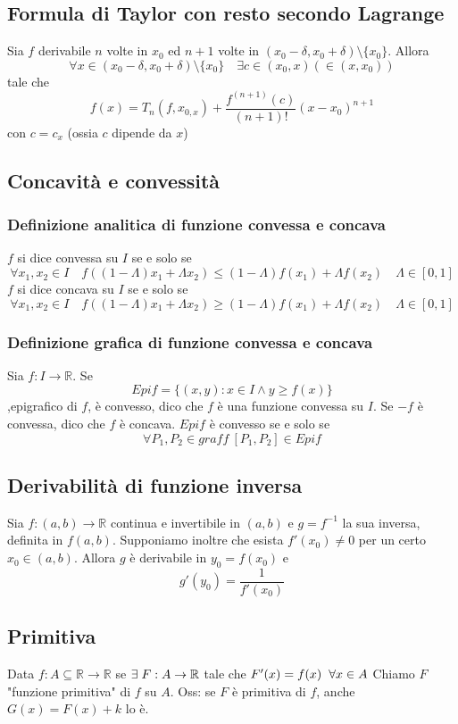 \documentclass[12pt]{article}
\begin{document}
\subsection{Formula di Taylor con resto secondo Lagrange}
Sia $f$ derivabile $n$ volte in $x_0$ ed $n+1$ volte
in $(x_0 - \delta, x_0 + \delta) \setminus \{x_0\}$. Allora 
\[ 
\forall x \in (x_0 - \delta, x_0 + \delta) \setminus \{x_0\} \quad \exists c \in (x_0, x) (\in(x, x_0))
\] 
tale che 
\[ 
f(x) = T_n(f, x_{0,x}) + \frac{f^{(n+1)}(c)}{(n+1)!}(x-x_0)^{n+1} 
\]
con $c=c_x$ (ossia $c$ dipende da $x$)

\subsection{Concavità e convessità}
\subsubsection{Definizione analitica di funzione convessa e concava}
$f$ si dice convessa su $I$ se e solo se
\[\forall x_1,x_2 \in I \quad f((1-\Lambda)x_1+\Lambda x_2) \leq (1-\Lambda)f(x_1) + \Lambda f(x_2) \quad \Lambda \in [0,1]\]
$f$ si dice concava su $I$ se e solo se
\[\forall x_1,x_2 \in I \quad f((1-\Lambda)x_1+\Lambda x_2) \geq (1-\Lambda)f(x_1) + \Lambda f(x_2) \quad \Lambda \in [0,1]\]

\subsubsection{Definizione grafica di funzione convessa e concava}
Sia $f: I \to \mathbb{R}$. Se 
\[Epif = \{(x,y): x \in I \wedge y \geq f(x)\}\]
,epigrafico di $f$, è convesso, dico che $f$ è una funzione convessa su $I$. Se $-f$ è convessa, dico che $f$ è concava.\newline
$Epif$ è convesso se e solo se
\[ \forall P_1,P_2 \in graff\ [P_1, P_2] \in Epif \]

\subsection{Derivabilità di funzione inversa}
Sia $f: (a,b) \to \mathbb{R}$ continua e invertibile in $(a,b)$ e $g = f^{-1}$ la sua inversa, definita in $f(a,b)$. Supponiamo inoltre che esista $f'(x_0) \neq 0$ per un certo $x_0 \in (a,b)$. Allora $g$ è derivabile in $y_0 = f(x_0)$ e
\[ g'(y_0) = \frac{1}{f'(x_0)} \]

\subsection{Primitiva}
Data $f: A\subseteq \mathbb{R} \to \mathbb{R}$ se $\exists \hspace*{0.1cm} F: A \to \mathbb{R}$
tale che $F'(x) = f(x) \hspace*{0.2cm} \forall x \in A$\newline
Chiamo $F$ "funzione primitiva" di $f$ su $A$.\newline
Oss: se $F$ è primitiva di $f$, anche $G(x) = F(x) + k$ lo è.
\end{document}
